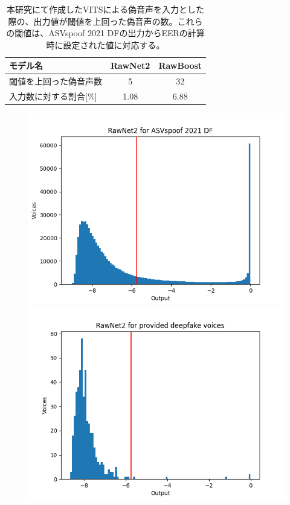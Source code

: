 \begin{table}[p]
    \centering
    \begin{tabular}{lcc}\hline
        モデル名 & RawNet2 & RawBoost \\ \hline \hline
        閾値を上回った偽音声数 & 5 & 32 \\
        入力数に対する割合[\%] & 1.08 & 6.88 \\ \hline
    \end{tabular}
    \caption{本研究にて作成したVITSによる偽音声を入力とした際の、出力値が閾値を上回った偽音声の数。これらの閾値は、ASVspoof 2021 DFの出力からEERの計算時に設定された値に対応する。}
    \label{tab:greater}
\end{table}

\begin{figure}
    \centering
    \begin{minipage}[b]{0.45\hsize}
        \centering
        \includegraphics[width=\linewidth]{figures/rawnet2_asv.png} 
        \subcaption{}
    \end{minipage}
    \begin{minipage}[b]{0.45\hsize}
        \centering
        \includegraphics[width=\linewidth]{figures/rawnet2_prop.png}

\end{minipage}
\end{figure}
